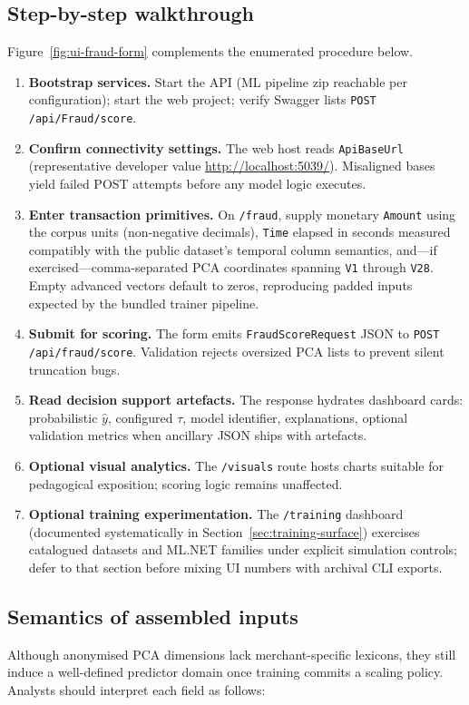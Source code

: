 \subsection{Step-by-step walkthrough}
Figure~\ref{fig:ui-fraud-form} complements the enumerated procedure below.

\begin{enumerate}
    \item \textbf{Bootstrap services.} Start the API (ML pipeline zip reachable per configuration); start the web project; verify Swagger lists \texttt{POST /api/\allowbreak Fraud/\allowbreak score}.
    \item \textbf{Confirm connectivity settings.} The web host reads \texttt{ApiBaseUrl} (representative developer value \url{http://localhost:5039/}). Misaligned bases yield failed POST attempts before any model logic executes.
    \item \textbf{Enter transaction primitives.} On \texttt{/fraud}, supply monetary \texttt{Amount} using the corpus units (non-negative decimals), \texttt{Time} elapsed in seconds measured compatibly with the public dataset's temporal column semantics, and—if exercised—comma-separated PCA coordinates spanning \texttt{V1} through \texttt{V28}. Empty advanced vectors default to zeros, reproducing padded inputs expected by the bundled trainer pipeline.
    \item \textbf{Submit for scoring.} The form emits \texttt{Fraud\allowbreak Score\allowbreak Request} JSON to \texttt{POST /api/fraud/\allowbreak score}. Validation rejects oversized PCA lists to prevent silent truncation bugs.
    \item \textbf{Read decision support artefacts.} The response hydrates dashboard cards: probabilistic $\hat{y}$, configured $\tau$, model identifier, explanations, optional validation metrics when ancillary JSON ships with artefacts.
    \item \textbf{Optional visual analytics.} The \texttt{/visuals} route hosts charts suitable for pedagogical exposition; scoring logic remains unaffected.
    \item \textbf{Optional training experimentation.} The \texttt{/training} dashboard (documented systematically in Section~\ref{sec:training-surface}) exercises catalogued datasets and ML.NET families under explicit simulation controls; defer to that section before mixing UI numbers with archival CLI exports.
\end{enumerate}

\subsection{Semantics of assembled inputs}
\noindent
Although anonymised PCA dimensions lack merchant-specific lexicons, they still induce a well-defined predictor domain once training commits a scaling policy. Analysts should interpret each field as follows:

